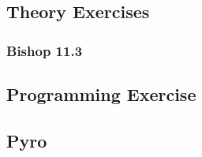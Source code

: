 \subsection{Theory Exercises}

\subsubsection*{Bishop 11.3}

\subsection{Programming Exercise}

\subsection{Pyro}
